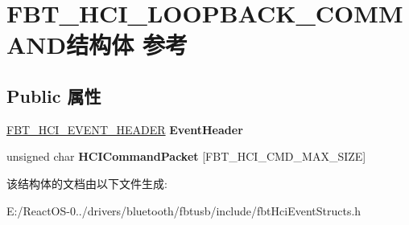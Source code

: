 \hypertarget{struct_f_b_t___h_c_i___l_o_o_p_b_a_c_k___c_o_m_m_a_n_d}{}\section{F\+B\+T\+\_\+\+H\+C\+I\+\_\+\+L\+O\+O\+P\+B\+A\+C\+K\+\_\+\+C\+O\+M\+M\+A\+N\+D结构体 参考}
\label{struct_f_b_t___h_c_i___l_o_o_p_b_a_c_k___c_o_m_m_a_n_d}
\subsection*{Public 属性}
\begin{DoxyCompactItemize}
\item 
\mbox{\label{struct_f_b_t___h_c_i___l_o_o_p_b_a_c_k___c_o_m_m_a_n_d_a47d0f1357124c4b16914de2be2ed2910}} 
\hyperlink{struct_f_b_t___h_c_i___e_v_e_n_t___h_e_a_d_e_r}{F\+B\+T\+\_\+\+H\+C\+I\+\_\+\+E\+V\+E\+N\+T\+\_\+\+H\+E\+A\+D\+ER} {\bfseries Event\+Header}
\item 
\mbox{\label{struct_f_b_t___h_c_i___l_o_o_p_b_a_c_k___c_o_m_m_a_n_d_a44281f6522000db79a00da06c2730906}} 
unsigned char {\bfseries H\+C\+I\+Command\+Packet} \mbox{[}F\+B\+T\+\_\+\+H\+C\+I\+\_\+\+C\+M\+D\+\_\+\+M\+A\+X\+\_\+\+S\+I\+ZE\mbox{]}
\end{DoxyCompactItemize}


该结构体的文档由以下文件生成\+:\begin{DoxyCompactItemize}
\item 
E\+:/\+React\+O\+S-\/0../drivers/bluetooth/fbtusb/include/fbt\+Hci\+Event\+Structs.\+h\end{DoxyCompactItemize}
